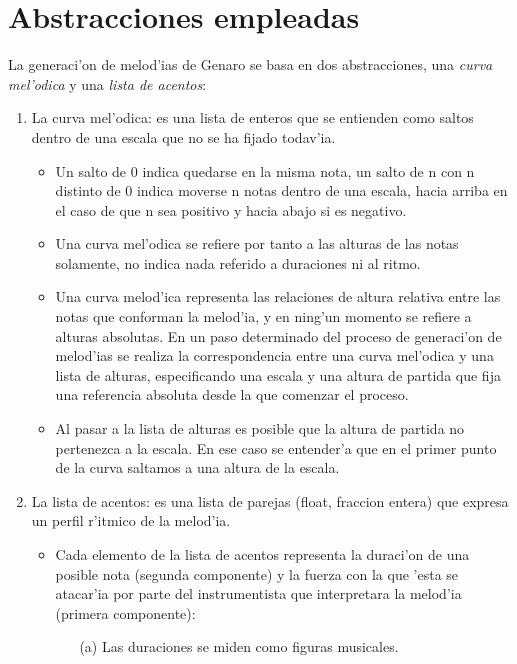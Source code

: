 \section{Abstracciones empleadas}
La generaci'on de melod'ias de Genaro se basa en dos abstracciones, una \emph{curva mel'odica} y una \emph{lista de acentos}:
        \begin{enumerate}
        \item La curva mel'odica: es una lista de enteros que se entienden como saltos dentro de una escala que no se ha fijado todav'ia.
                \begin{itemize}
                \item Un salto de 0 indica quedarse en la misma nota, un salto de n con n distinto de 0 indica moverse n notas dentro de una escala, hacia arriba en el caso de que n sea positivo y hacia abajo si es negativo.
                \item Una curva mel'odica se refiere por tanto a las alturas de las notas solamente, no indica nada referido a duraciones ni al ritmo.
                \item Una curva melod'ica representa las relaciones de altura relativa entre las notas que conforman la melod'ia, y en ning'un momento se refiere a alturas absolutas. En un paso determinado del proceso de generaci'on de melod'ias se realiza la correspondencia entre una curva mel'odica y una lista de alturas, especificando una escala y una altura de partida que fija una referencia absoluta desde la que comenzar el proceso.
                \item Al pasar a la lista de alturas es posible que la altura de partida no pertenezca a la escala. En ese caso se entender'a que en el primer punto de la curva saltamos a una altura de la escala.
                \end{itemize}
        \item La lista de acentos: es una lista de parejas (float, fraccion entera) que expresa un perfil r'itmico de la melod'ia.
                \begin{itemize}
                \item Cada elemento de la lista de acentos representa la duraci'on de una posible nota (segunda componente) y la fuerza con la que 'esta se atacar'ia por parte del instrumentista que interpretara la melod'ia (primera componente):
                        \begin{enumerate}
                        \item[(a)] Las duraciones se miden como figuras musicales.

\end{enumerate}
\end{itemize}
\end{enumerate}
